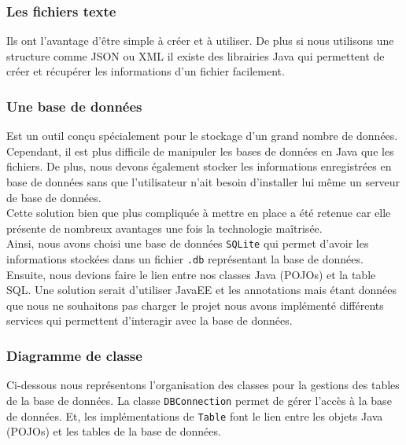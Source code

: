 \documentclass[10pt,a4paper]{article}
\begin{document}
\subsubsection{Les fichiers texte}
\indent Ils ont l'avantage d'être simple à créer et à utiliser. De plus si nous utilisons une structure comme JSON ou XML il existe des librairies Java qui permettent de créer et récupérer les informations d'un fichier facilement.

\subsubsection{Une base de données}
\indent Est un outil conçu spécialement pour le stockage d'un grand nombre de données. Cependant, il est plus difficile de manipuler les bases de données en Java que les fichiers. De plus, nous devons également stocker les informations enregistrées en base de données sans que l'utilisateur n'ait besoin d'installer lui même un serveur de base de données. \\
Cette solution bien que plus compliquée à mettre en place a été retenue car elle présente de nombreux avantages une fois la technologie maîtrisée. \\

Ainsi, nous avons choisi une base de données \verb|SQLite| qui permet d'avoir les informations stockées dans un fichier \verb|.db| représentant la base de données. Ensuite, nous devions faire le lien entre nos classes Java (POJOs) et la table SQL. Une solution serait d'utiliser JavaEE et les annotations mais étant données que nous ne souhaitons pas charger le projet nous avons implémenté différents services qui permettent d'interagir avec la base de données.

\subsubsection{Diagramme de classe} \label{BDD}
Ci-dessous nous représentons l'organisation des classes pour la gestions des tables de la base de données.
La classe \verb|DBConnection| permet de gérer l'accès à la base de données. Et, les implémentations de \verb|Table| font le lien entre les objets Java (POJOs) et les tables de la base de données.
\end{document}
